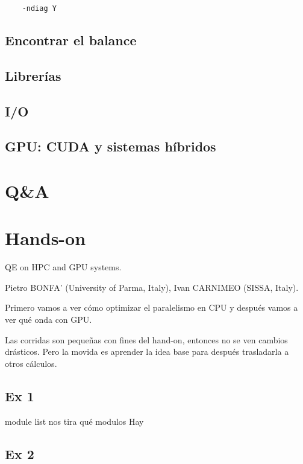   \begin{verbatim}
    -ndiag Y
  \end{verbatim}

\subsection{Encontrar el balance}


\subsection{Librerías}


\subsection{I/O}


\subsection{GPU: CUDA y sistemas híbridos}


\section{Q\&A}

\section{Hands-on}

   QE on HPC and GPU systems.

   Pietro BONFA' (University of Parma, Italy), Ivan CARNIMEO (SISSA, Italy).

  Primero vamos a ver cómo optimizar el paralelismo en CPU y después vamos a ver qué onda con GPU.

  Las corridas son pequeñas con fines del hand-on, entonces no se ven cambios drásticos. Pero la movida es aprender la idea base para después trasladarla a otros cálculos.


\subsection{Ex 1}

  module list nos tira qué modulos Hay


\subsection{Ex 2}


